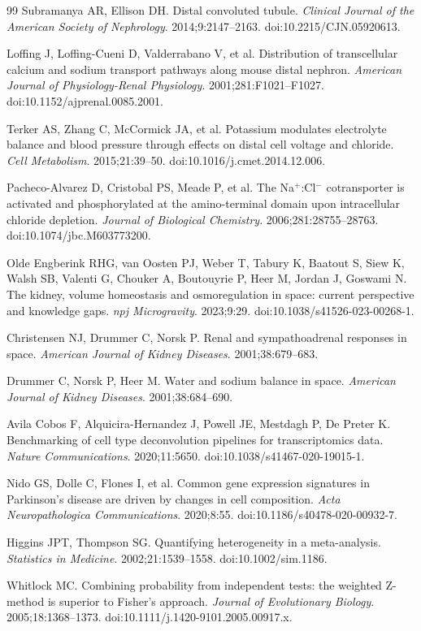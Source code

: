 \documentclass[11pt]{article}
\begin{document}
\begin{thebibliography}{99}
 Subramanya AR, Ellison DH. Distal convoluted tubule. \emph{Clinical Journal of the American Society of Nephrology}. 2014;9:2147--2163. doi:10.2215/CJN.05920613.

 Loffing J, Loffing-Cueni D, Valderrabano V, et al. Distribution of transcellular calcium and sodium transport pathways along mouse distal nephron. \emph{American Journal of Physiology-Renal Physiology}. 2001;281:F1021--F1027. doi:10.1152/ajprenal.0085.2001.

 Terker AS, Zhang C, McCormick JA, et al. Potassium modulates electrolyte balance and blood pressure through effects on distal cell voltage and chloride. \emph{Cell Metabolism}. 2015;21:39--50. doi:10.1016/j.cmet.2014.12.006.

 Pacheco-Alvarez D, Cristobal PS, Meade P, et al. The Na$^+$:Cl$^-$ cotransporter is activated and phosphorylated at the amino-terminal domain upon intracellular chloride depletion. \emph{Journal of Biological Chemistry}. 2006;281:28755--28763. doi:10.1074/jbc.M603773200.

 Olde Engberink RHG, van Oosten PJ, Weber T, Tabury K, Baatout S, Siew K, Walsh SB, Valenti G, Chouker A, Boutouyrie P, Heer M, Jordan J, Goswami N. The kidney, volume homeostasis and osmoregulation in space: current perspective and knowledge gaps. \emph{npj Microgravity}. 2023;9:29. doi:10.1038/s41526-023-00268-1.

 Christensen NJ, Drummer C, Norsk P. Renal and sympathoadrenal responses in space. \emph{American Journal of Kidney Diseases}. 2001;38:679--683. %

 Drummer C, Norsk P, Heer M. Water and sodium balance in space. \emph{American Journal of Kidney Diseases}. 2001;38:684--690. %

 Avila Cobos F, Alquicira-Hernandez J, Powell JE, Mestdagh P, De Preter K. Benchmarking of cell type deconvolution pipelines for transcriptomics data. \emph{Nature Communications}. 2020;11:5650. doi:10.1038/s41467-020-19015-1.

 Nido GS, Dolle C, Flones I, et al. Common gene expression signatures in Parkinson's disease are driven by changes in cell composition. \emph{Acta Neuropathologica Communications}. 2020;8:55. doi:10.1186/s40478-020-00932-7.

 Higgins JPT, Thompson SG. Quantifying heterogeneity in a meta-analysis. \emph{Statistics in Medicine}. 2002;21:1539--1558. doi:10.1002/sim.1186.

 Whitlock MC. Combining probability from independent tests: the weighted Z-method is superior to Fisher's approach. \emph{Journal of Evolutionary Biology}. 2005;18:1368--1373. doi:10.1111/j.1420-9101.2005.00917.x.

\end{thebibliography}
\end{document}
